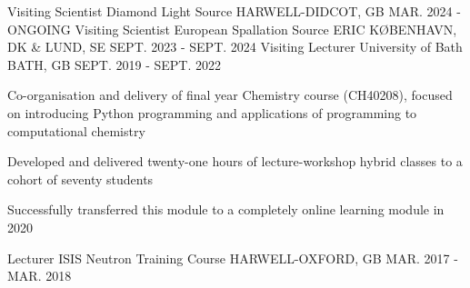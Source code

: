 \begin{cventries}
	\cventry
	{Visiting Scientist}
	{Diamond Light Source}
	{HARWELL-DIDCOT, GB}
	{MAR. 2024 - ONGOING}
	{
	}
	\cventry
	{Visiting Scientist}
	{European Spallation Source ERIC}
	{K\O BENHAVN, DK \& LUND, SE}
	{SEPT. 2023 - SEPT. 2024}
	{
	}
	\cventry
	{Visiting Lecturer}
	{University of Bath}
	{BATH, GB}
	{SEPT. 2019 - SEPT. 2022}
	{
		\begin{cvitems}
			\item {Co-organisation and delivery of final year Chemistry course (CH40208), focused on introducing Python programming and applications of programming to computational chemistry}
			\item {Developed and delivered twenty-one hours of lecture-workshop hybrid classes to a cohort of seventy students}
			\item {Successfully transferred this module to a completely online learning module in 2020}
		\end{cvitems}
	}
	\cventry
	{Lecturer}
	{ISIS Neutron Training Course}
	{HARWELL-OXFORD, GB}
	{MAR. 2017 - MAR. 2018}
	{
	}
\end{cventries}
